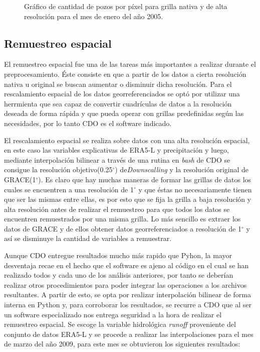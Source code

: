     \begin{figure}[H]
        \centering
              \goodgap
              \vskip -0.1in
        \caption[Cantidad de pozos en cada grilla]{Gráfico de cantidad de pozos por píxel para grilla nativa y de alta resolución para el mes de enero del año 2005.}
        \label{pixeldepth}
    \end{figure}

    \subsection{Remuestreo espacial}
    
    El remuestreo espacial fue una de las tareas más importantes a realizar durante el preprocesamiento. Éste consiste en que a partir de los datos a cierta
    resolución nativa u original se buscan aumentar o disminuir dicha resolución. Para el rescalamiento espacial de los datos georreferenciados se optó por utilizar una herrmienta que sea capaz de convertir 
    cuadrículas de datos a la resolución deseada de forma rápida y que pueda operar con grillas predefinidas según las necesidades, por lo tanto CDO es el software indicado. 

    
    El rescalamiento espacial se realiza sobre datos con una alta resolución espacial, en este caso las variables explicativas de ERA5-L y precipitación y luego, mediante interpolación bilinear a través de una rutina en \textit{bash} de CDO se consigue
    la resolución objetivo(0.25$^\circ$) de\textit{Downscalling} y la resolución original de GRACE(1$^\circ$). Es claro que hay muchas maneras de formar las grillas de datos los cuales se encuentren a una resolución de 
    1$^\circ$ y que éstas no necesariamente tienen que ser las mismas entre ellas, es por esto que se fija la grilla a baja resolución y alta resolución antes de realizar el remuestreo
    para que todos los datos se encuentren remuestrados por una misma grilla. Lo más sencillo es extraer los datos de GRACE y de ellos obtener datos georreferenciados a resolución de 1$^\circ$ y así se disminuye la cantidad de
    variables a remuestrar.

    Aunque CDO entregue resultados mucho más rapido que Pyhon, la mayor desventaja recae en el hecho que el software es ajeno al código en el cual se han realizado todos y cada uno de los análisis anteriores, por tanto se deberían realizar otros procedimientos para poder integrar las operaciones a los archivos resultantes.
    A partir de esto, se opta por realizar interpolación bilinear de forma interna en Python y, para corroborar los resultados, se recurre a CDO que al ser un software especializado nos entrega seguridad a la hora de realizar el remuestreo
    espacial. Se escoge la variable hidrológica \textit{runoff} proveniente del conjunto de datos ERA5-L y se procede a realizar las interpolaciones para el mes de marzo del año 2009, para este mes se obtuvieron los siguientes resultados:
    
